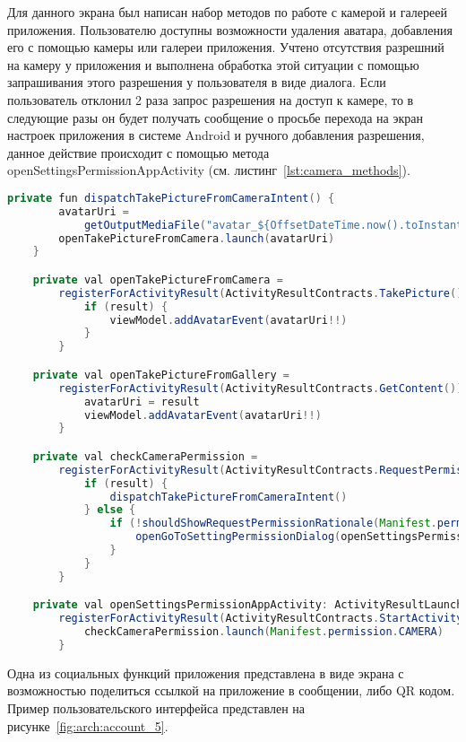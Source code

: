 Для данного экрана был написан набор методов по работе с камерой и галереей приложения. Пользователю доступны возможности удаления аватара, добавления его с помощью камеры или галереи приложения. Учтено отсутствия разрешний на камеру у приложения и выполнена обработка этой ситуации с помощью запрашивания этого разрешения у пользователя в виде диалога. Если пользователь отклонил 2 раза запрос разрешения на доступ к камере, то в следующие разы он будет получать сообщение о просьбе перехода на экран настроек приложения в системе Android и ручного добавления разрешения, данное действие происходит с помощью метода openSettingsPermissionAppActivity (см. листинг~\ref{lst:camera_methods}).
\begin{lstlisting}[language=Java,label={lst:camera_methods},caption={Методы для взаимодействия с камерой}]
private fun dispatchTakePictureFromCameraIntent() {
        avatarUri =
            getOutputMediaFile("avatar_${OffsetDateTime.now().toInstant().toEpochMilli()}.jpg")
        openTakePictureFromCamera.launch(avatarUri)
    }

    private val openTakePictureFromCamera =
        registerForActivityResult(ActivityResultContracts.TakePicture()) { result ->
            if (result) {
                viewModel.addAvatarEvent(avatarUri!!)
            }
        }

    private val openTakePictureFromGallery =
        registerForActivityResult(ActivityResultContracts.GetContent()) { result ->
            avatarUri = result
            viewModel.addAvatarEvent(avatarUri!!)
        }

    private val checkCameraPermission =
        registerForActivityResult(ActivityResultContracts.RequestPermission()) { result ->
            if (result) {
                dispatchTakePictureFromCameraIntent()
            } else {
                if (!shouldShowRequestPermissionRationale(Manifest.permission.CAMERA)) {
                    openGoToSettingPermissionDialog(openSettingsPermissionAppActivity)
                }
            }
        }

    private val openSettingsPermissionAppActivity: ActivityResultLauncher<Intent> =
        registerForActivityResult(ActivityResultContracts.StartActivityForResult()) {
            checkCameraPermission.launch(Manifest.permission.CAMERA)
        }
\end{lstlisting}

Одна из социальных функций приложения представлена в виде экрана с возможностью поделиться ссылкой на приложение в сообщении, либо QR кодом. Пример пользовательского интерфейса представлен на рисунке~\ref{fig:arch:account_5}.


